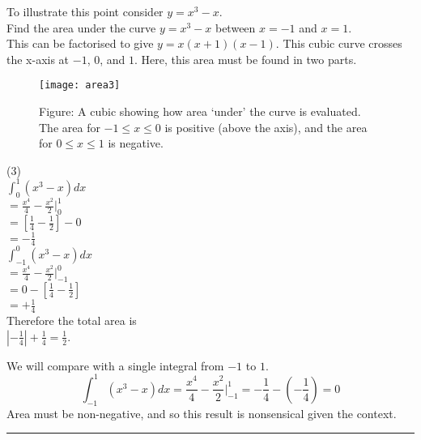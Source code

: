 To illustrate this point consider $y =x^{3} -x$. \medskip\\
\example Find the area under the curve $y =x^{3} -x$ between $x = -1$ and $x =1$.\medskip\\
\solution This can be factorised to give $y =x (x +1) (x -1)$. This cubic curve crosses the x-axis at $ -1$, $0$, and $1$. Here, this area must be found in two parts.
\begin{SCfigure}[1][h]
	\texttt{[image: area3]}
	\caption*{Figure: A cubic showing how area `under' the curve is evaluated. The area for $-1\leq x\leq 0$ is positive (above the axis), and the area for $0\leq x\leq 1$ is negative.}
\end{SCfigure}
\begin{tasks}(3)
	\task[\phantom{a}]\\ 
	$\int _{0}^{1}(x^{3} -x) dx$\\
	$=\frac{x^4}{4}-\frac{x^2}{2}\vert_{0}^1$\\
	$=[\frac{1}{4}-\frac{1}{2}]-0$\\
	$=-\frac{1}{4}$
	\task[\phantom{a}]\\ 
	$\int _{ -1}^{0}(x^{3} -x) d x$ \\
	$=\frac{x^4}{4}-\frac{x^2}{2}\vert_{-1}^0$\\
	$=0-[\frac{1}{4}-\frac{1}{2}]$\\
	$=+\frac{1}{4}$
	\task[\phantom{a}]\\ 
	Therefore the total area is\\
	 $|-\frac{1}{4}|+\frac{1}{4}=\frac{1}{2}$.
\end{tasks}
We will compare with a single integral from $-1$ to $1$.	
\[\int _{ -1}^{1}(x^{3} -x) d x=\frac{x^4}{4}-\frac{x^2}{2}\vert_{-1}^1 =-\frac{1}{4}-(-\frac{1}{4})=0\]
Area must be non-negative, and so this result is nonsensical given the context.\\  
\rule{6.8cm}{0.5pt}\\
\example 
